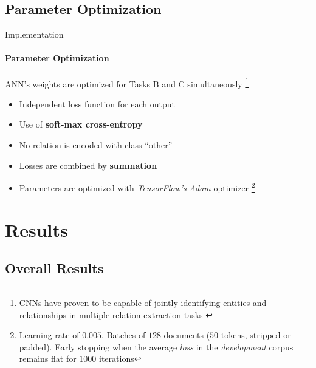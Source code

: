 \documentclass{beamer}
\begin{document}
\subsection{Parameter Optimization}

\begin{frame}{Implementation}
\framesubtitle{Parameter Optimization}

ANN's weights are optimized for Tasks B and C simultaneously \footnote{CNNs have proven to be capable of jointly identifying entities and relationships in multiple relation extraction tasks \cite{singh2013joint} \cite{shickel2017deep} \cite{li2017neural}}

\begin{itemize}
  \item Independent loss function for each output
  \item Use of \textbf{soft-max cross-entropy}
  \item No relation is encoded with class ``other''
  \item Losses are combined by \textbf{summation}
  \item Parameters are optimized with \emph{TensorFlow's} \emph{Adam} optimizer \footnote{Learning rate of $0.005$. Batches of $128$ documents ($50$ tokens, stripped or padded). Early stopping when the average \emph{loss} in the \emph{development} corpus remains flat for $1000$ iterations}
\end{itemize}

\end{frame}




%
%

\section{Results}


\subsection{Overall Results}
\end{document}
